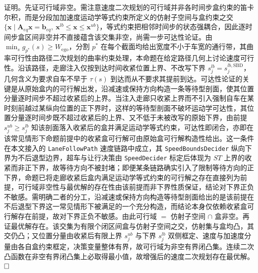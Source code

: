 \documentclass[a4paper,11pt]{ctexart}
\theoremstyle{definition}
\begin{document}
证明。先证可行域非空。需注意速度二次规划的可行域并非各时间步盒约束的笛卡尔积，而是分段加加速度运动学等式约束所定义的仿射子空间与盒约束之交 $\{\mathbf{x}\mid \mathbf{A}_{eq}\mathbf{x}=\mathbf{b}_{eq},\ \mathbf{x}^{lb}\le\mathbf{x}\le\mathbf{x}^{ub}\}$，等式约束把相邻时间步的状态强耦合，因此逐时间步盒区间非空并不直接蕴含该交集非空，尚需一步可达性论证。由 $\min_s g_{p^{*}}(s) \geq W_{\text{ego}}$，分割 $p^{*}$ 在每个截面均给出宽度不小于车宽的通行带，其曲率可行性由路径二次规划的曲率约束处理，本命题在给定路径几何上讨论速度可行性。沿该路径，走廊注入仅按到达时间收紧位置上界、不改写下界 $s_j^{lb}=s_j^{lb,\mathrm{SBD}}$，几何含义为要求自车不早于 $\tau(s)$ 到达而从不要求其提前到达。可达性论证的关键是从原始盒内的可行解出发，沿减速或保持方向构造一条等待型剖面，使其位置分量逐时间步不超过收紧后的上界。当注入走廊只收紧上界而不引入强制自车在某时刻前越过某纵向位置的正下界时，这样的等待型剖面不破坏运动学可达性，其位置分量逐时间步既不超过收紧后的上界、又不低于未被改写的原始下界，由前提 $s_j^{ub} \geq s_j^{lb}$ 知该剖面落入收紧后的盒并满足运动学等式约束，可达性即闭合，亦即在该常见情形下命题前提中的收紧盒可行解可由原始盒可行解构造性给出。这一条件在本文接入的 \texttt{LaneFollowPath} 速度链路中成立，其 \texttt{SpeedBoundsDecider} 纵向下界为不后退型边界，超车与让行决策由 \texttt{SpeedDecider} 标定后体现为 $ST$ 上界的收紧而非正下界，故等待方向不被封堵；即便某条链路确实引入了限制等待方向的正下界，命题已将走廊收紧后盒内满足运动学等式约束的可行解之存在直接列为前提，可行域非空性与最优解的存在性由该前提而非下界性质保证，结论对下界正负不敏感。需明确二者的分工，沿减速或保持方向构造等待型剖面给出的是该前提在不后退型下界这一常见情形下被满足的一个充分构造，而结论本身仅依赖收紧盒可行解存在前提，故对下界正负不敏感。由此可行域 $=$ 仿射子空间 $\cap$ 盒非空。再证最优解存在。该交集为有限个闭区间盒与仿射子空间之交，仿射集与盒均凸，其交仍凸；又位置分量由收紧后有限上界 $s_j^{ub}$ 与下界 $s_j^{lb}$ 双侧框定、速度与加速度分量由各自盒约束框定，决策变量整体有界，故可行域为非空有界闭凸集。连续二次凸函数在非空有界闭凸集上必取得最小值，故增强后的速度二次规划存在最优解。$\hfill\Box$
\end{document}
